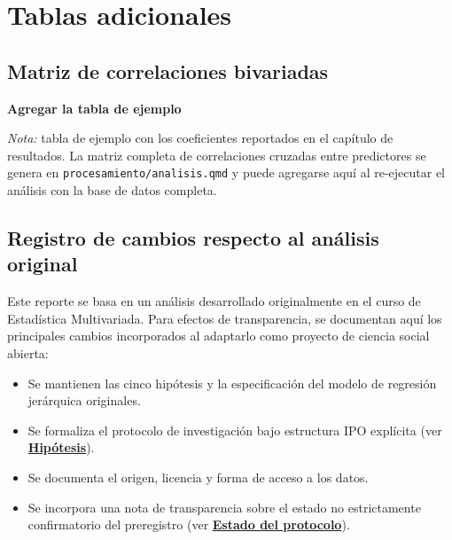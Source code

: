 \documentclass[
  spanish,
  a4paper,
  oneside]{scrbook}
\providecommand{\tightlist}{%
  \setlength{\itemsep}{0pt}\setlength{\parskip}{0pt}}
\begin{document}
\chapter{Tablas adicionales}\label{tablas-adicionales}

\section{Matriz de correlaciones
bivariadas}\label{matriz-de-correlaciones-bivariadas}

\textbf{Agregar la tabla de ejemplo}

\emph{Nota:} tabla de ejemplo con los coeficientes reportados en el
capítulo de resultados. La matriz completa de correlaciones cruzadas
entre predictores se genera en \texttt{procesamiento/analisis.qmd} y
puede agregarse aquí al re-ejecutar el análisis con la base de datos
completa.

\section{Registro de cambios respecto al análisis
original}\label{registro-de-cambios-respecto-al-anuxe1lisis-original}

Este reporte se basa en un análisis desarrollado originalmente en el
curso de Estadística Multivariada. Para efectos de transparencia, se
documentan aquí los principales cambios incorporados al adaptarlo como
proyecto de ciencia social abierta:

\begin{itemize}
\tightlist
\item
  Se mantienen las cinco hipótesis y la especificación del modelo de
  regresión jerárquica originales.
\item
  Se formaliza el protocolo de investigación bajo estructura IPO
  explícita (ver \href{../03-hipotesis.html}{\textbf{Hipótesis}}).
\item
  Se documenta el origen, licencia y forma de acceso a los datos.
\item
  Se incorpora una nota de transparencia sobre el estado no
  estrictamente confirmatorio del preregistro (ver
  \href{../03-hipotesis.html}{\textbf{Estado del protocolo}}).
\end{itemize}


\backmatter

\mainmatter
\pagestyle{scrheadings}

\end{document}
